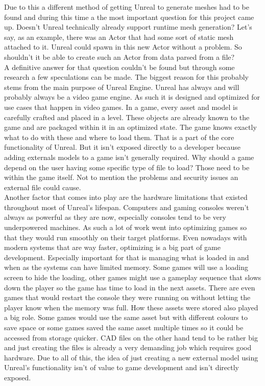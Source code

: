 Due to this a different method of getting Unreal to generate meshes had to be found and during this time a the most important question for this project came up. Doesn't Unreal technically already support runtime mesh generation? Let's say, as an example, there was an Actor that had some sort of static mesh attached to it. Unreal could spawn in this new Actor without a problem. So shouldn't it be able to create such an Actor from data parsed from a file?\\
A definitive answer for that question couldn't be found but through some research a few speculations can be made. The biggest reason for this probably stems from the main purpose of Unreal Engine. Unreal has always and will probably always be a video game engine. As such it is designed and optimized for use cases that happen in video games. In a game, every asset and model is carefully crafted and placed in a level. These objects are already known to the game and are packaged within it in an optimized state. The game knows exactly what to do with these and where to load them. That is a part of the core functionality of Unreal. But it isn't exposed directly to a developer because adding externals models to a game isn't generally required. Why should a game depend on the user having some specific type of file to load? Those need to be within the game itself. Not to mention the problems and security issues an external file could cause.\\
Another factor that comes into play are the hardware limitations that existed throughout most of Unreal's lifespan. Computers and gaming consoles weren't always as powerful as they are now, especially consoles tend to be very underpowered machines. As such a lot of work went into optimizing games so that they would run smoothly on their target platforms. Even nowadays with modern systems that are way faster, optimizing is a big part of game development. Especially important for that is managing what is loaded in and when as the systems can have limited memory. Some games will use a loading screen to hide the loading, other games might use a gameplay sequence that slows down the player so the game has time to load in the next assets. There are even games that would restart the console they were running on without letting the player know when the memory was full\cite{}. How these assets were stored also played a big role. Some games would use the same asset but with different colours to save space or some games saved the same asset multiple times so it could be accessed from storage quicker\cite{}. CAD files on the other hand tend to be rather big and just creating the files is already a very demanding job which requires good hardware. Due to all of this, the idea of just creating a new external model using Unreal's functionality isn't of value to game development and isn't directly exposed.\\
